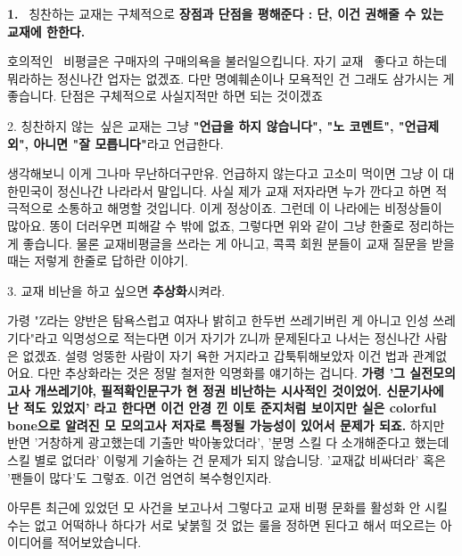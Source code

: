\item \textbf{1.}  칭찬하는 교재는 구체적으로 \textbf{장점과 단점을 평해준다 : 단, 이건 권해줄 수 있는 교재에 한한다.}
\vspace{5mm}

호의적인  비평글은 구매자의 구매의욕을 불러일으킵니다.
자기 교재  좋다고 하는데 뭐라하는 정신나간 업자는 없겠죠.
다만 명예훼손이나 모욕적인 건 그래도 삼가시는 게 좋습니다. 단점은 구체적으로 사실지적만 하면 되는 것이겠죠
\vspace{5mm}

\item 2. 칭찬하지 않는 싶은 교재는 그냥 \textbf{"언급을 하지 않습니다", "노 코멘트", "언급제외", 아니면 "잘 모릅니다"}라고 언급한다.
\vspace{5mm}

생각해보니 이게 그나마 무난하더구만유. 언급하지 않는다고 고소미 먹이면 그냥 이 대한민국이 정신나간 나라라서 말입니다.
사실 제가 교재 저자라면 누가 깐다고 하면 적극적으로 소통하고 해명할 것입니다. 이게 정상이죠.
그런데 이 나라에는 비정상들이 많아요. 똥이 더러우면 피해갈 수 밖에 없죠, 그렇다면 위와 같이 그냥 한줄로 정리하는 게 좋습니다.
물론 교재비평글을 쓰라는 게 아니고, 콕콕 회원 분들이 교재 질문을 받을 때는 저렇게 한줄로 답하란 이야기.
\vspace{5mm}

\item 3. 교재 비난을 하고 싶으면 \textbf{추상화}시켜라.
\vspace{5mm}

가령 "Z라는 양반은 탐욕스럽고 여자나 밝히고 한두번 쓰레기버린 게 아니고 인성 쓰레기다"라고 익명성으로 적는다면
이거 자기가 Z니까 문제된다고 나서는 정신나간 사람은 없겠죠. 설령 엉뚱한 사람이 자기 욕한 거지라고 갑툭튀해보았자 이건 법과 관계없어요.
다만 추상화라는 것은 정말 철저한 익명화를 얘기하는 겁니다.
\textbf{가령 '그 실전모의고사 개쓰레기야, 필적확인문구가 현 정권 비난하는 시사적인 것이었어. 신문기사에 난 적도 있었지'}
\textbf{라고 한다면 이건 안경 낀 이토 준지처럼 보이지만 실은 colorful bone으로 알려진 모 모의고사 저자로 특정될 가능성이 있어서 문제가 되죠.}
하지만 반면 '거창하게 광고했는데 기출만 박아놓았더라', '분명 스킬 다 소개해준다고 했는데 스킬 별로 없더라'
이렇게 기술하는 건 문제가 되지 않습니당. '교재값 비싸더라' 혹은 '팬들이 많다'도 그렇죠. 이건 엄연히 복수형인지라.
\vspace{5mm}

아무튼 최근에 있었던 모 사건을 보고나서 그렇다고 교재 비평 문화를 활성화 안 시킬 수는 없고 어떡하나 하다가
서로 낯붉힐 것 없는 룰을 정하면 된다고 해서 떠오르는 아이디어를 적어보았습니다.
\vspace{5mm}


